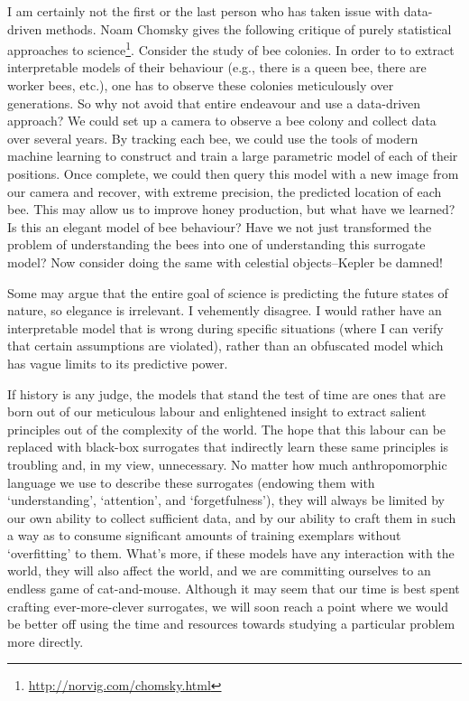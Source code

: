 I am certainly not the first or the last person who has taken issue with data-driven methods. Noam Chomsky gives the following critique of purely statistical approaches to science\footnote{\url{http://norvig.com/chomsky.html}}. Consider the study of bee colonies. In order to to extract interpretable models of their behaviour (e.g., there is a queen bee, there are worker bees, etc.), one has to observe these colonies meticulously over generations. So why not avoid that entire endeavour and use a data-driven approach? We could set up a camera to observe a bee colony and collect data over several years. By tracking each bee, we could use the tools of modern machine learning to construct and train a large parametric model of each of their positions. Once complete, we could then query this model with a new image from our camera and recover, with extreme precision, the predicted location of each bee. This may allow us to improve honey production, but what have we learned? Is this an elegant model of bee behaviour? Have we not just transformed the problem of understanding the bees into one of understanding this surrogate model? Now consider doing the same with celestial objects--Kepler be damned!

Some may argue that the entire goal of science is predicting the future states of nature, so elegance is irrelevant. I vehemently disagree. I would rather have an interpretable model that is wrong during specific situations (where I can verify that certain assumptions are violated), rather than an obfuscated model which has vague limits to its predictive power.

If history is any judge, the models that stand the test of time are ones that are born out of our meticulous labour and enlightened insight to extract salient principles out of the complexity of the world. The hope that this labour can be replaced with black-box surrogates that indirectly learn these same principles is troubling and, in my view, unnecessary. No matter how much anthropomorphic language we use to describe these surrogates (endowing them with `understanding', `attention', and `forgetfulness'), they will always be limited by our own ability to collect sufficient data, and by our ability to craft them in such a way as to consume significant amounts of training exemplars without `overfitting' to them. What's more, if these models have any interaction with the world, they will also affect the world, and we are committing ourselves to an endless game of cat-and-mouse. Although it may seem that our time is best spent crafting ever-more-clever surrogates, we will soon reach a point where we would be better off using the time and resources towards studying a particular problem more directly.

